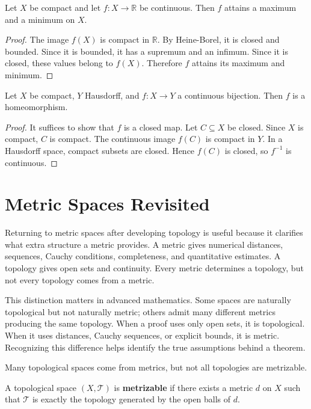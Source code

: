 \begin{theorem}
Let $X$ be compact and let $f:X\to\mathbb{R}$ be continuous. Then $f$ attains a maximum and a minimum on $X$.
\end{theorem}

\begin{proof}
The image $f(X)$ is compact in $\mathbb{R}$. By Heine-Borel, it is closed and bounded. Since it is bounded, it has a supremum and an infimum. Since it is closed, these values belong to $f(X)$. Therefore $f$ attains its maximum and minimum.
\end{proof}

\begin{theorem}
Let $X$ be compact, $Y$ Hausdorff, and $f:X\to Y$ a continuous bijection. Then $f$ is a homeomorphism.
\end{theorem}

\begin{proof}
It suffices to show that $f$ is a closed map. Let $C\subseteq X$ be closed. Since $X$ is compact, $C$ is compact. The continuous image $f(C)$ is compact in $Y$. In a Hausdorff space, compact subsets are closed. Hence $f(C)$ is closed, so $f^{-1}$ is continuous.
\end{proof}

\section{Metric Spaces Revisited}


Returning to metric spaces after developing topology is useful because it clarifies what extra structure a metric provides. A metric gives numerical distances, sequences, Cauchy conditions, completeness, and quantitative estimates. A topology gives open sets and continuity. Every metric determines a topology, but not every topology comes from a metric.

This distinction matters in advanced mathematics. Some spaces are naturally topological but not naturally metric; others admit many different metrics producing the same topology. When a proof uses only open sets, it is topological. When it uses distances, Cauchy sequences, or explicit bounds, it is metric. Recognizing this difference helps identify the true assumptions behind a theorem.

Many topological spaces come from metrics, but not all topologies are metrizable.

\begin{definition}
A topological space $(X,\mathcal{T})$ is \textbf{metrizable} if there exists a metric $d$ on $X$ such that $\mathcal{T}$ is exactly the topology generated by the open balls of $d$.
\end{definition}

